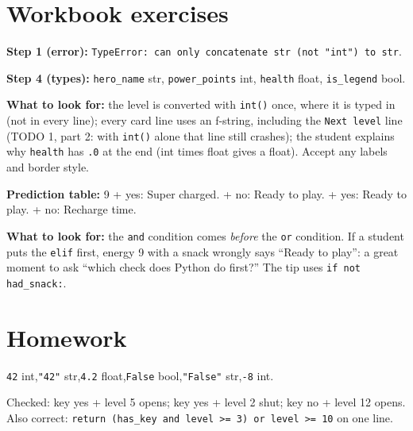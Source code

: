 
\section{Workbook exercises}
\begin{answer}
\textbf{Step 1 (error):} \texttt{TypeError: can only concatenate str (not "int") to str}.\par
\textbf{Step 4 (types):} \texttt{hero\_name} str, \texttt{power\_points} int, \texttt{health} float, \texttt{is\_legend} bool.\par
\textbf{What to look for:} the level is converted with \texttt{int()} once, where it is typed in (not in every line);
every card line uses an f-string, including the \texttt{Next level} line (TODO 1, part 2: with \texttt{int()} alone that line still crashes); the student explains why \texttt{health} has \texttt{.0} at the end (int times float gives a float).
Accept any labels and border style.
\end{answer}

\begin{answer}
\textbf{Prediction table:} 9 + yes: Super charged. + no: Ready to play. + yes: Ready to play. + no: Recharge time.\par
\textbf{What to look for:} the \texttt{and} condition comes \emph{before} the \texttt{or} condition. If a student puts the
\texttt{elif} first, energy 9 with a snack wrongly says \enquote{Ready to play}: a great moment to ask
\enquote{which check does Python do first?} The tip uses \texttt{if not had\_snack:}.
\end{answer}

\section{Homework}
\begin{answer}
\texttt{42} int,\quad \texttt{"42"} str,\quad \texttt{4.2} float,\quad \texttt{False} bool,\quad \texttt{"False"} str,\quad \texttt{-8} int.
\end{answer}

\begin{answer}
Checked: key yes + level 5 opens; key yes + level 2 shut; key no + level 12 opens.
Also correct: \texttt{return (has\_key and level >= 3) or level >= 10} on one line.
\end{answer}

